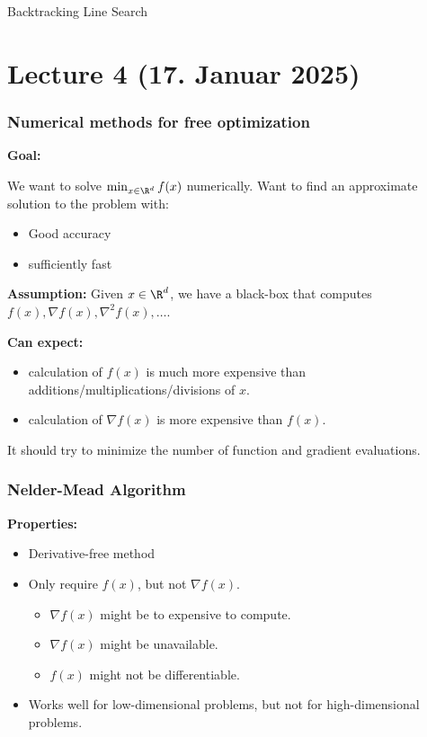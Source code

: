 \begin{algorithm}[H]
	\caption{Backtracking Line Search}
	\label{alg:backtracking}
	\;
	\KwRet{ \(\alpha\)}\;
\end{algorithm}
\newpage

\section{Lecture 4 (17. Januar 2025)}

\subsubsection*{Numerical methods for free optimization}

\textbf{Goal:}

We want to solve \( \min_{x \in \R^d} f(x) \) numerically. Want to find an approximate solution to the problem with:

\begin{itemize}
	\item Good accuracy
	\item sufficiently fast
\end{itemize}

\textbf{Assumption:} Given  \( x \in \R^d \), we have a black-box that computes  \(f(x), \nabla f(x), \nabla^2 f(x) , \ldots \).

\textbf{Can expect:}
\begin{itemize}
	\item calculation of \(f(x)\) is much more expensive than additions/multiplications/divisions of \(x\).
	\item calculation of \(\nabla f(x)\) is more expensive than \(f(x)\).
\end{itemize}

It should try to minimize the number of function and gradient evaluations.

\subsubsection*{Nelder-Mead Algorithm}
\textbf{Properties:}
\begin{itemize}
	\item Derivative-free method
	\item Only require  \(f(x)\), but not  \(\nabla f(x)\).
	      \begin{itemize}
		      \item  \(\nabla f(x)\) might be to expensive to compute.
		      \item  \(\nabla f(x)\) might be unavailable.
		      \item  \(f(x)\) might not be differentiable.
	      \end{itemize}
	\item Works well for low-dimensional problems, but not for high-dimensional problems.
\end{itemize}

